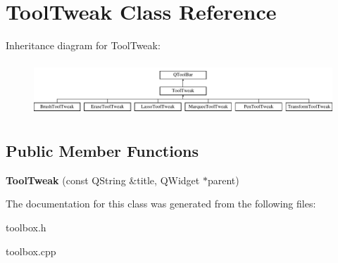 \hypertarget{class_tool_tweak}{\section{Tool\-Tweak Class Reference}
\label{class_tool_tweak}
}
Inheritance diagram for Tool\-Tweak\-:\begin{figure}[H]
\begin{center}
\leavevmode
\includegraphics[height=2.043796cm]{class_tool_tweak}
\end{center}
\end{figure}
\subsection*{Public Member Functions}
\begin{DoxyCompactItemize}
\item 
\hypertarget{class_tool_tweak_abb2e54f714e34704f6b02dc2d1033634}{{\bfseries Tool\-Tweak} (const Q\-String \&title, Q\-Widget $\ast$parent)}\label{class_tool_tweak_abb2e54f714e34704f6b02dc2d1033634}

\end{DoxyCompactItemize}


The documentation for this class was generated from the following files\-:\begin{DoxyCompactItemize}
\item 
toolbox.\-h\item 
toolbox.\-cpp\end{DoxyCompactItemize}
